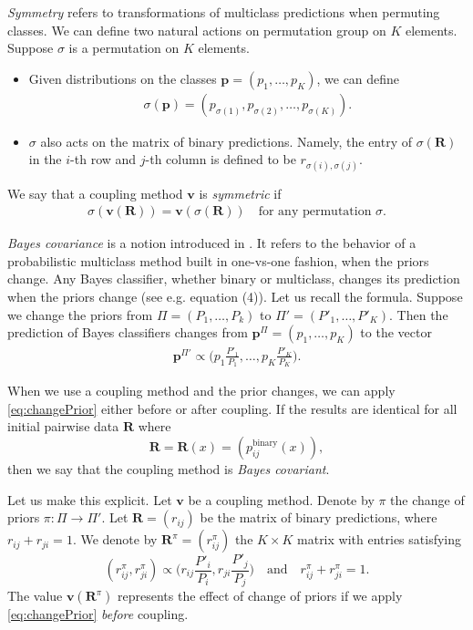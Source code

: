 \emph{Symmetry} refers to transformations of multiclass predictions when permuting classes. We can define two natural actions on permutation group on $K$ elements. Suppose $\sigma$ is a permutation on $K$ elements. 

\begin{itemize}
	\item Given  distributions on the classes $\boldsymbol{p}= (p_1, \ldots, p_K)$, we can define
	\begin{align}
		\sigma(\boldsymbol{p})= (p_{\sigma(1)},p_{\sigma(2)}, \ldots, p_{\sigma(K)}).
	\end{align}
	 \item $\sigma$ also acts on the matrix of binary predictions. Namely, the entry of $\sigma(\boldsymbol{R})$ in the $i$-th row and $j$-th column is defined to be $r_{\sigma(i), \sigma(j)}$.
	 \end{itemize}
We say that a coupling method $\boldsymbol{v}$ is \emph{symmetric} if 
\begin{align}
		\sigma(\boldsymbol{v}(\boldsymbol{R})) = \boldsymbol{v}(\sigma(\boldsymbol{R}))\quad\textrm{for any permutation $\sigma$}. \label{eq:symmetry}
\end{align}

\emph{Bayes covariance} is a notion introduced in  \cite{vsuch2016bayes}.
It refers to the behavior of a probabilistic multiclass method built in one-vs-one fashion, when the priors change. 
Any Bayes classifier, whether binary or multiclass, changes its prediction when the priors change (see e.g. \cite{saerens2002adjusting} equation (4)).  
Let us recall the formula. Suppose we change the priors from $\Pi = (P_1, \ldots, P_k)$ to $\Pi'= (P'_1, \ldots, P'_K)$. 
Then the prediction of Bayes classifiers changes from $\boldsymbol{p}^\Pi= (p_1, \ldots, p_K)$ to the vector 
\begin{align}
\boldsymbol{p}^{\Pi'} \propto \biggl(p_1 \frac{P'_1}{P_1}, \ldots, p_K \frac{P'_K}{P_K}\biggr). \label{eq:changePrior}
\end{align}

When we use a coupling method and the prior changes, we  can apply \eqref{eq:changePrior} either before or after coupling. If the results are identical for all initial pairwise data $\boldsymbol{R}$ where
$$\boldsymbol{R} = \boldsymbol{R}(x) = (p_{ij}^{\textrm{binary}}(x)),$$ 
then we say that the coupling method is \emph{Bayes covariant}. 

Let us make this explicit. Let $\boldsymbol{v}$ be a coupling method. Denote by  $\pi$ the change of priors $\pi:\Pi \rightarrow \Pi'$. Let $\boldsymbol{R}=(r_{ij})$ be the matrix of binary predictions, where $r_{ij}+r_{ji}=1$. We denote by $\boldsymbol{R}^\pi=(r^\pi_{ij})$ the $K\times K$ matrix with entries satisfying 
$$
(r^\pi_{ij}, r^\pi_{ji}) \propto \biggl(r_{ij}\frac{P'_i}{P_i}, r_{ji}\frac{P'_j}{P_j}\biggr)
\quad
\textrm{and}
\quad
r^\pi_{ij}+r^\pi_{ji} = 1.
$$
The value $\boldsymbol{v}(\boldsymbol{R}^\pi)$ represents the effect of change of priors if we apply \eqref{eq:changePrior} \emph{before} coupling.

